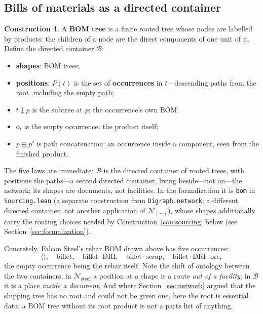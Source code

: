 \documentclass[11pt,a4paper]{article}
\newcommand{\N}{\mathcal{N}}
\newcommand{\B}{\mathcal{B}}
\newcommand{\dc}{\mathbin{\downarrow}}
\newcommand{\obs}{\mathsf{o}}
\theoremstyle{plain}
\theoremstyle{definition}
\newtheorem{construction}[theorem]{Construction}
\theoremstyle{remark}
\begin{document}
\subsection{Bills of materials as a directed container}\label{sec:bom}

\begin{construction}\label{con:bom}
A \textbf{BOM tree} is a finite rooted tree whose nodes are labelled
by products: the children of a node are the direct components of one
unit of it. Define the directed container
$\B$:
\begin{itemize}[nosep]
\item \textbf{shapes}: BOM trees;
\item \textbf{positions}: $P(t)$ is the set of \textbf{occurrences}
  in $t$---descending paths from the root, including the empty path;
\item $t \dc p$ is the subtree at $p$: the occurrence's own BOM;
\item $\obs_t$ is the empty occurrence: the product itself;
\item $p \oplus p'$ is path concatenation: an occurrence inside a
  component, seen from the finished product.
\end{itemize}
The five laws are immediate: $\B$ is the directed container of
rooted trees, with positions the paths---a second directed
container, living beside---not on---the network; its
shapes are documents, not facilities. In the formalization it is
\texttt{bom} in \texttt{Sourcing.lean} (a separate construction from
\texttt{Digraph.network}; a different directed container, not another
application of $\N_{(-)}$), whose shapes additionally
carry the routing choices needed by
Construction~\ref{con:sourcing} below (see
Section~\ref{sec:formalization}).
\end{construction}

Concretely, Falcon Steel's rebar BOM drawn above has five
occurrences:
\[
\langle\rangle,\quad
\text{billet},\quad
\text{billet}\cdot\text{DRI},\quad
\text{billet}\cdot\text{scrap},\quad
\text{billet}\cdot\text{DRI}\cdot\text{ore},
\]
the empty occurrence being the rebar itself. Note the shift of
ontology between the two containers: in $\N_{\mathrm{steel}}$ a
position at a shape is a route \emph{out of a facility}; in $\B$ it
is a place \emph{inside a document}. And where
Section~\ref{sec:network} argued that the shipping tree has no root
and could not be given one, here the root is essential data: a BOM
tree without its root product is not a parts list of anything.
\end{document}
